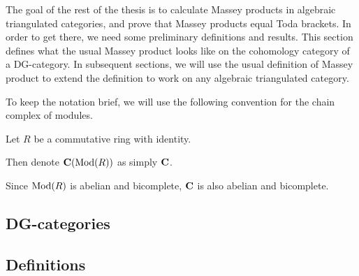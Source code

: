The goal of the rest of the thesis is to calculate Massey products in algebraic triangulated categories, and prove that Massey products equal Toda brackets. In order to get there, we need some preliminary definitions and results. This section defines what the usual Massey product looks like on the cohomology category of a DG-category. In subsequent sections, we will use the usual definition of Massey product to extend the definition to work on any algebraic triangulated category.

To keep the notation brief, we will use the following convention for the chain complex of modules.
\begin{notation}
    Let \( R \) be a commutative ring with identity.

    Then denote \( \operatorname{\mathbf{C}}(\operatorname{Mod}(R)) \) as simply \( \operatorname{\mathbf{C}} \).
\end{notation}

Since \( \operatorname{Mod}(R) \) is abelian and bicomplete, \( \operatorname{\mathbf{C}} \) is also abelian and bicomplete.

\subsection{DG-categories}


\subsection{Definitions}

